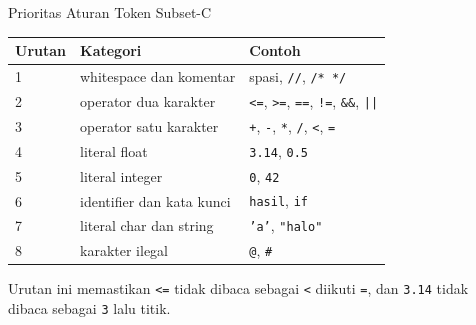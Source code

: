 \documentclass[aspectratio=169,10pt,t]{beamer}
\begin{document}
\begin{frame}{Prioritas Aturan Token Subset-C}
  \small
  \setlength{\tabcolsep}{4pt}
  \begin{tabular}{@{}p{1.2cm}p{4.2cm}p{8.6cm}@{}}
    \toprule
    \textbf{Urutan} & \textbf{Kategori} & \textbf{Contoh} \\
    \midrule
    1 & whitespace dan komentar & spasi, \texttt{//}, \texttt{/* */} \\
    2 & operator dua karakter & \texttt{<=}, \texttt{>=}, \texttt{==}, \texttt{!=}, \texttt{\&\&}, \texttt{||} \\
    3 & operator satu karakter & \texttt{+}, \texttt{-}, \texttt{*}, \texttt{/}, \texttt{<}, \texttt{=} \\
    4 & literal float & \texttt{3.14}, \texttt{0.5} \\
    5 & literal integer & \texttt{0}, \texttt{42} \\
    6 & identifier dan kata kunci & \texttt{hasil}, \texttt{if} \\
    7 & literal char dan string & \texttt{'a'}, \texttt{"halo"} \\
    8 & karakter ilegal & \texttt{@}, \texttt{\#} \\
    \bottomrule
  \end{tabular}

  \vspace{4pt}
  {\footnotesize\color{ubbblue!80}Urutan ini memastikan \texttt{<=}
  tidak dibaca sebagai \texttt{<} diikuti \texttt{=}, dan
  \texttt{3.14} tidak dibaca sebagai \texttt{3} lalu titik.}
\end{frame}
\end{document}
